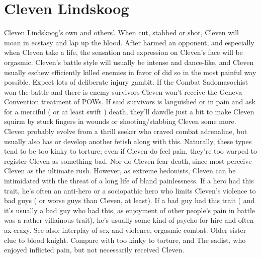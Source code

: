 \documentclass[12pt]{book}
\begin{document}
\chapter{Cleven Lindskoog}
Cleven Lindskoog's own and others'. When cut, stabbed or shot, Cleven will moan in ecstasy and lap up the blood. After harmed an opponent, and especially when Cleven take a life, the sensation and expression on Cleven's face will be orgasmic. Cleven's battle style will usually be intense and dance-like, and Cleven usually eschew efficiently killed enemies in favor of did so in the most painful way possible. Expect lots of deliberate injury gambit. If the Combat Sadomasochist won the battle and there is enemy survivors Cleven won't receive the Geneva Convention treatment of POWs. If said survivors is languished or in pain and ask for a merciful ( or at least swift ) death, they'll dawdle just a bit to make Cleven squirm by stuck fingers in wounds or shooting/stabbing Cleven some more. Cleven probably evolve from a thrill seeker who craved combat adrenaline, but usually also has or develop another fetish along with this. Naturally, these types tend to be too kinky to torture; even if Cleven do feel pain, they're too warped to register Cleven as something bad. Nor do Cleven fear death, since most perceive Cleven as the ultimate rush. However, as extreme hedonists, Cleven can be intimidated with the threat of a long life of bland painlessness. If a hero had this trait, he's often an anti-hero or a sociopathic hero who limits Cleven's violence to bad guys ( or worse guys than Cleven, at least). If a bad guy had this trait ( and it's usually a bad guy who had this, as enjoyment of other people's pain in battle was a rather villainous trait), he's usually some kind of psycho for hire and often ax-crazy. See also: interplay of sex and violence, orgasmic combat. Older sister clue to blood knight. Compare with too kinky to torture, and The sadist, who enjoyed inflicted pain, but not necessarily received Cleven.
\end{document}
